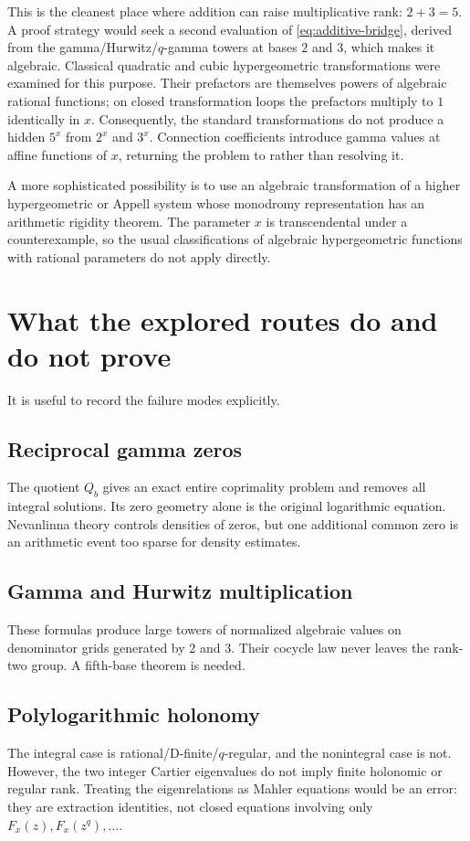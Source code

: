 \documentclass[11pt]{article}
\numberwithin{equation}{section}
\theoremstyle{definition}
\theoremstyle{remark}
\begin{document}
This is the cleanest place where addition can raise multiplicative rank: $2+3=5$.  A proof strategy would seek a second evaluation of \eqref{eq:additive-bridge}, derived from the gamma/Hurwitz/$q$-gamma towers at bases $2$ and $3$, which makes it algebraic.  Classical quadratic and cubic hypergeometric transformations were examined for this purpose.  Their prefactors are themselves powers of algebraic rational functions; on closed transformation loops the prefactors multiply to $1$ identically in $x$.  Consequently, the standard transformations do not produce a hidden $5^x$ from $2^x$ and $3^x$.  Connection coefficients introduce gamma values at affine functions of $x$, returning the problem to  rather than resolving it.

A more sophisticated possibility is to use an algebraic transformation of a higher hypergeometric or Appell system whose monodromy representation has an arithmetic rigidity theorem.  The parameter $x$ is transcendental under a counterexample, so the usual classifications of algebraic hypergeometric functions with rational parameters do not apply directly.

\section{What the explored routes do and do not prove}
\label{sec:failures}

It is useful to record the failure modes explicitly.

\subsection{Reciprocal gamma zeros}
The quotient $Q_b$ gives an exact entire coprimality problem and removes all integral solutions.  Its zero geometry alone is the original logarithmic equation.  Nevanlinna theory controls densities of zeros, but one additional common zero is an arithmetic event too sparse for density estimates.

\subsection{Gamma and Hurwitz multiplication}
These formulas produce large towers of normalized algebraic values on denominator grids generated by $2$ and $3$.  Their cocycle law never leaves the rank-two group.  A fifth-base theorem is needed.

\subsection{Polylogarithmic holonomy}
The integral case is rational/D-finite/$q$-regular, and the nonintegral case is not.  However, the two integer Cartier eigenvalues do not imply finite holonomic or regular rank.  Treating the eigenrelations as Mahler equations would be an error: they are extraction identities, not closed equations involving only $F_x(z),F_x(z^q),\ldots$.
\end{document}
